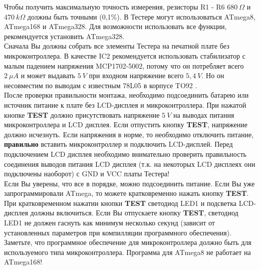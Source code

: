 Чтобы получить максимальную точность измерения, резисторы R1 - R6 \(680~\Omega\) и
\(470~k\Omega\) должны быть точными (0,1\%). В Тестере могут использоваться ATmega8, ATmega168 и ATmega328. Для 
возможности использовать все функции, рекомендуется установить ATmega328.\\
 
Сначала Вы должны собрать все элементы Тестера на печатной плате без микроконтроллера. В качестве IC2 рекомендуется 
использовать стабилизатор с малым падением напряжения MCP1702-5002, потому что он потребляет всего  \(2~\mu A\) и может 
выдавать \(5~V\) при входном напряжение всего \(5,4~V\). Но он несовместим по выводам с известным 78L05 в корпусе TO92 .\\

После проверки правильности монтажа, необходимо подсоединить батарею или источник питание к плате без LCD-дисплея и 
микроконтроллера. При нажатой кнопке \textbf{ TEST} должно присутствовать напряжение \(5~V\) на выводах питания 
микроконтроллера и LCD дисплея. Если отпустить кнопку \textbf{ TEST}, напряжение должно исчезнуть. Если  напряжения 
в норме, то необходимо отключить питание, \textbf{ правильно} вставить микроконтроллер и подключить LCD-дисплей. 
Перед подключением LCD дисплея необходимо 
внимательно проверить правильность соединения выводов питания LCD дисплея (т.к. на некоторых LCD дисплеях они 
подключены наоборот) с GND и VCC платы Тестера!\\
 
Если Вы уверены, что все в порядке, можно подсоединить питание. Если Вы уже запрограммировали ATmega, то можете 
кратковременно нажать кнопку \textbf{ TEST}. При кратковременном нажатии кнопки \textbf{ TEST} светодиод LED1 и подсветка 
LCD-дисплея должны включиться. 
Если Вы отпускаете кнопку \textbf{ TEST}, светодиод LED1 не должен гаснуть как минимум несколько секунд 
(зависит от установленных параметров при компилляции программного обеспечения). 
Заметьте, что программное обеспечение для микроконтроллера должно быть для используемого типа микроконтроллера. Программа для ATmega8 не работает на ATmega168!


